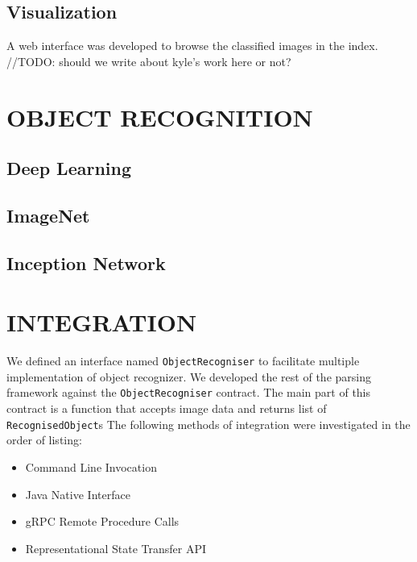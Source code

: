 \documentclass[letterpaper, 10 pt, conference]{ieeeconf}  %
\begin{document}
\subsection{Visualization} \label{sec:memex-visualization}
A web interface was developed to browse the classified images in the index. //TODO: should we write about kyle's work here or not?

\section{OBJECT RECOGNITION} \label{sec:obj-rec}

\subsection{Deep Learning } \label{sec:deeplearning-imagenet}
\subsection{ImageNet} \label{sec:imagenet}

\subsection{Inception Network } \label{sec:inceptionnet}

\section{INTEGRATION} \label{sec:integration}
We defined an interface named \texttt{ObjectRecogniser} to facilitate multiple implementation of object recognizer. We developed the rest of the parsing framework against the \texttt{ObjectRecogniser} contract. The main part of this contract is a function that accepts image data and returns list of \texttt{RecognisedObject}s
The following methods of integration were investigated in the order of listing:
\begin{itemize}
\item Command Line Invocation
\item Java Native Interface
\item gRPC Remote Procedure Calls
\item Representational State Transfer API 
\end{itemize}
\end{document}
